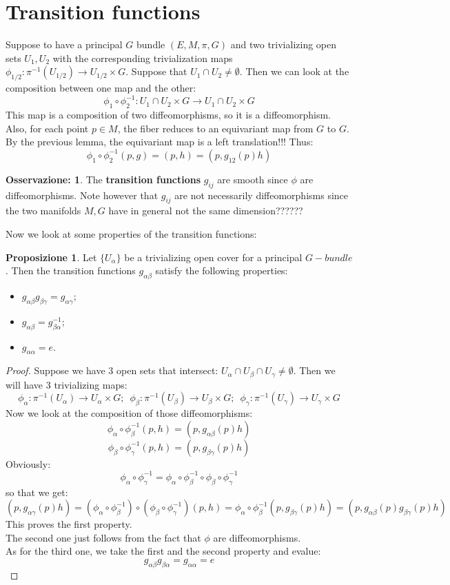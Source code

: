 \documentclass[12pt,a4paper]{report}
\theoremstyle{definition}
\theoremstyle{Theorem}
\newtheorem{Prop}[Def]{Proposizione}
\theoremstyle{definition}
\theoremstyle{definition}
\theoremstyle{definition}
\newtheorem{Obs}[Def]{Osservazione:}
\begin{document}
	\section{Transition functions}
	Suppose to have a principal $G$ bundle $(E,M,\pi,G)$ and two trivializing open sets $U_1,U_2$ with the corresponding trivialization maps $\phi_{1/2}:\pi^{-1}(U_{1/2})\rightarrow U_{1/2}\times G$. Suppose that $U_1\cap U_2\neq\emptyset$. Then we can look at the composition between one map and the other:
	$$\phi_1\circ\phi_2^{-1}:U_{1}\cap U_2\times G\rightarrow U_{1}\cap U_2\times G$$
	This map is a composition of two diffeomorphisms, so it is a diffeomorphism. Also, for each point $p\in M$, the fiber reduces to an equivariant map from $G$ to $G$. By the previous lemma, the equivariant map is a left translation!!! Thus:
	$$\phi_1\circ\phi_2^{-1}(p,g)=(p,h)=(p,g_{12}(p)h)$$
	\begin{Obs}
		The \textbf{transition functions} $g_{ij}$ are smooth since $\phi$ are diffeomorphisms. Note however that $g_{ij}$ are not necessarily diffeomorphisms since the two manifolds $M,G$ have in general not the same dimension??????
	\end{Obs}
	Now we look at some properties of the transition functions:
	\begin{Prop}
		Let $\{U_\alpha\}$ be a trivializing open cover for a principal $G-bundle$. Then the transition functions $g_{\alpha\beta}$ satisfy the following properties:
		\begin{itemize}
			\item $g_{\alpha\beta}g_{\beta\gamma}=g_{\alpha\gamma}$;
			\item $g_{\alpha\beta}=g_{\beta\alpha}^{-1}$;
			\item $g_{\alpha\alpha}=e$.
		\end{itemize}
	\end{Prop}
	\begin{proof}
		Suppose we have 3 open sets that intersect: $U_\alpha\cap U_\beta\cap U_\gamma\neq\emptyset$. Then we will have 3 trivializing maps:
		$$\phi_\alpha:\pi^{-1}(U_\alpha)\rightarrow U_\alpha\times G;
		\hspace{6pt}
		\phi_\beta:\pi^{-1}(U_\beta)\rightarrow U_\beta\times G;
		\hspace{6pt}
		\phi_\gamma:\pi^{-1}(U_\gamma)\rightarrow U_\gamma\times G
		$$
		Now we look at the composition of those diffeomorphisms:
		$$\phi_\alpha\circ\phi^{-1}_\beta(p,h)=(p,g_{\alpha\beta}(p)h)$$
		$$\phi_\beta\circ\phi^{-1}_\gamma(p,h)=(p,g_{\beta\gamma}(p)h)$$
		Obviously:
		$$\phi_\alpha\circ\phi^{-1}_\gamma=\phi_\alpha\circ\phi^{-1}_\beta\circ \phi_\beta\circ\phi^{-1}_\gamma$$
		so that we get:
		$$(p,g_{\alpha\gamma}(p)h)=(\phi_\alpha\circ\phi^{-1}_\beta)\circ (\phi_\beta\circ\phi^{-1}_\gamma)(p,h)=\phi_\alpha\circ\phi^{-1}_\beta(p,g_{\beta\gamma}(p)h)=(p,g_{\alpha\beta}(p)g_{\beta\gamma}(p)h)$$
		This proves the first property.
		\\
		The second one just follows from the fact that $\phi$ are diffeomorphisms.\\
		As for the third one, we take the first and the second property and evalue:
		$$g_{\alpha\beta}g_{\beta\alpha}=g_{\alpha\alpha}=e$$
	\end{proof}
\end{document}
